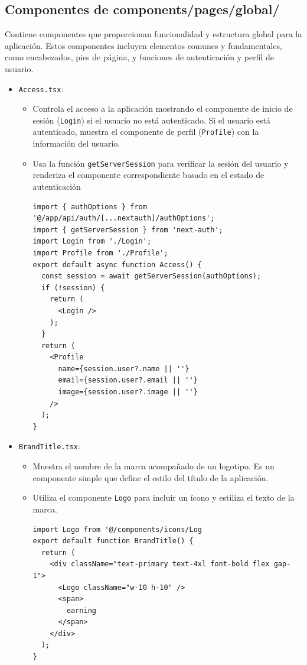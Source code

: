\subsection{Componentes de components/pages/global/}
Contiene componentes que proporcionan funcionalidad y estructura global para la aplicación. Estos componentes incluyen elementos comunes y fundamentales, como encabezados, pies de página, y funciones de autenticación y perfil de usuario.
\begin{itemize}
  \item \texttt{Access.tsx}:
  \begin{itemize}
      \item Controla el acceso a la aplicación mostrando el componente de inicio de sesión (\texttt{Login}) si el usuario no está autenticado. Si el usuario está autenticado, muestra el componente de perfil (\texttt{Profile}) con la información del usuario.
      \item Usa la función \texttt{getServerSession} para verificar la sesión del usuario y renderiza el componente correspondiente basado en el estado de autenticación
      \begin{verbatim}
import { authOptions } from '@/app/api/auth/[...nextauth]/authOptions';
import { getServerSession } from 'next-auth';
import Login from './Login';
import Profile from './Profile';
export default async function Access() {
  const session = await getServerSession(authOptions);
  if (!session) {
    return (
      <Login />
    );
  }
  return (
    <Profile
      name={session.user?.name || ''}
      email={session.user?.email || ''}
      image={session.user?.image || ''}
    />
  );
}
      \end{verbatim}
  \end{itemize}
  
  \item \texttt{BrandTitle.tsx}:
  \begin{itemize}
      \item Muestra el nombre de la marca acompañado de un logotipo. Es un componente simple que define el estilo del título de la aplicación.
      \item Utiliza el componente \texttt{Logo} para incluir un ícono y estiliza el texto de la marca.
      \begin{verbatim}
import Logo from '@/components/icons/Log
export default function BrandTitle() {
  return (
    <div className="text-primary text-4xl font-bold flex gap-1">
      <Logo className="w-10 h-10" />
      <span>
        earning
      </span>
    </div>
  );
}
      \end{verbatim}
  \end{itemize}
  

\end{itemize}
